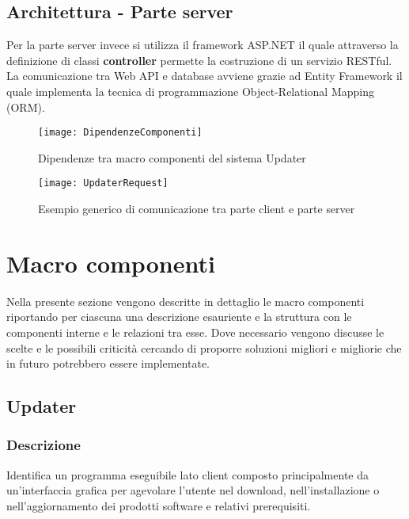 \documentclass[../RelazioneFinale.tex]{subfiles}
\begin{document}
			\subsection*{Architettura - Parte server}
			Per la parte server invece si utilizza il framework ASP.NET il quale attraverso la definizione di classi \textbf{controller} permette la costruzione di un servizio RESTful. La comunicazione tra Web API e database avviene grazie ad Entity Framework il quale implementa la tecnica di programmazione Object-Relational Mapping (ORM).

			\vfill			
			
			\begin{figure}[h]
				\centering
				\texttt{[image: DipendenzeComponenti]}
				\caption{Dipendenze tra macro componenti del sistema Updater}
				\label{fig:DipendenzeComponenti}
			\end{figure}
			
			\begin{figure}[p]
				\texttt{[image: UpdaterRequest]}
				\caption{Esempio generico di comunicazione tra parte client e parte server}
				\label{fig:UpdaterRequest}
			\end{figure}
		
\newpage
		
	\section{Macro componenti}
		Nella presente sezione vengono descritte in dettaglio le macro componenti riportando per ciascuna una descrizione esauriente e la struttura con le componenti interne e le relazioni tra esse. Dove necessario vengono discusse le scelte e le possibili criticità cercando di proporre soluzioni migliori e migliorie che in futuro potrebbero essere implementate.
			
			
		
		\subsection{Updater}
		
			\subsubsection{Descrizione}
				Identifica un programma eseguibile lato client composto principalmente da un'interfaccia grafica per agevolare l'utente nel download, nell'installazione o nell'aggiornamento dei prodotti software e relativi prerequisiti.
			
\end{document}
